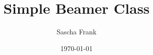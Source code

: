 \documentclass{beamer}
\begin{document}
\title{Simple Beamer Class}
\author{Sascha Frank} 
\date{\today} 

\frame{\titlepage} 



\end{document}
